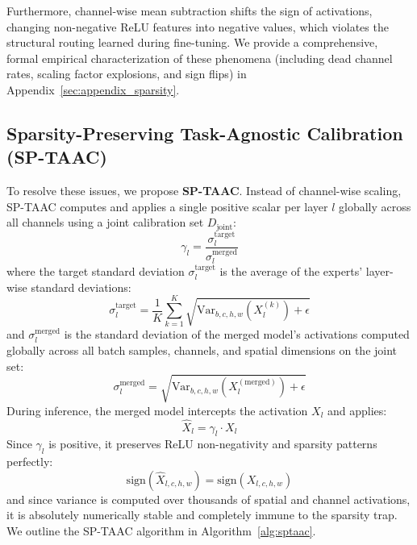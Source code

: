 \documentclass{article}
\theoremstyle{plain}
\theoremstyle{definition}
\theoremstyle{remark}
\begin{document}
Furthermore, channel-wise mean subtraction shifts the sign of activations, changing non-negative ReLU features into negative values, which violates the structural routing learned during fine-tuning. We provide a comprehensive, formal empirical characterization of these phenomena (including dead channel rates, scaling factor explosions, and sign flips) in Appendix~\ref{sec:appendix_sparsity}.

\subsection{Sparsity-Preserving Task-Agnostic Calibration (SP-TAAC)}
To resolve these issues, we propose \textbf{SP-TAAC}. Instead of channel-wise scaling, SP-TAAC computes and applies a single positive scalar per layer $l$ globally across all channels using a joint calibration set $D_{\text{joint}}$:
\begin{equation}
\gamma_l = \frac{\sigma_l^{\text{target}}}{\sigma_l^{\text{merged}}}
\end{equation}
where the target standard deviation $\sigma_l^{\text{target}}$ is the average of the experts' layer-wise standard deviations:
\begin{equation}
\sigma_l^{\text{target}} = \frac{1}{K} \sum_{k=1}^K \sqrt{\text{Var}_{b,c,h,w}(X_l^{(k)}) + \epsilon}
\end{equation}
and $\sigma_l^{\text{merged}}$ is the standard deviation of the merged model's activations computed globally across all batch samples, channels, and spatial dimensions on the joint set:
\begin{equation}
\sigma_l^{\text{merged}} = \sqrt{\text{Var}_{b,c,h,w}(X_l^{(\text{merged})}) + \epsilon}
\end{equation}
During inference, the merged model intercepts the activation $X_l$ and applies:
\begin{equation}
\hat{X}_l = \gamma_l \cdot X_l
\end{equation}
Since $\gamma_l$ is positive, it preserves ReLU non-negativity and sparsity patterns perfectly:
\begin{equation}
\text{sign}(\hat{X}_{l,c,h,w}) = \text{sign}(X_{l,c,h,w})
\end{equation}
and since variance is computed over thousands of spatial and channel activations, it is absolutely numerically stable and completely immune to the sparsity trap. We outline the SP-TAAC algorithm in Algorithm~\ref{alg:sptaac}.
\end{document}
